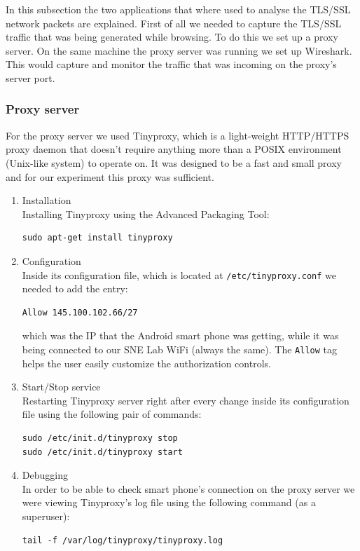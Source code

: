 \documentclass[12pt, a4paper]{report}
\begin{document}
In this subsection the two applications that where used to analyse the TLS/SSL network packets are explained. First of all we needed to capture the TLS/SSL traffic that was being generated while browsing. To do this we set up a proxy server. On the same machine the proxy server was running we set up Wireshark. This would capture and monitor the traffic that was incoming on the proxy's server port.


\subsubsection{Proxy server}

For the proxy server we used Tinyproxy, which is a light-weight HTTP/HTTPS proxy daemon that doesn't require anything more than a POSIX environment (Unix-like system) to operate on. It was designed to be a fast and small proxy and for our experiment this proxy was sufficient.

\begin{enumerate}
\item Installation \\
Installing Tinyproxy using the Advanced Packaging Tool:
\begin{lstlisting}[frame=single, breaklines=true]
sudo apt-get install tinyproxy			
\end{lstlisting}	

\item Configuration \\
Inside its configuration file, which is located at \texttt{/etc/tinyproxy.conf} we needed to add the entry:
\begin{lstlisting}[frame=single, breaklines=true]
Allow 145.100.102.66/27			
\end{lstlisting}		
which was the IP that the Android smart phone was getting, while it 			was being connected to our SNE Lab WiFi (always the same). The \texttt{Allow} tag helps the user easily customize the authorization controls. 

\item Start/Stop service \\
Restarting Tinyproxy server right after every change inside its configuration file using the following pair of commands:
\begin{lstlisting}[frame=single, breaklines=true]
sudo /etc/init.d/tinyproxy stop
sudo /etc/init.d/tinyproxy start			
\end{lstlisting}

\item Debugging \\
In order to be able to check smart phone's connection on the proxy server we were viewing Tinyproxy's log file using the following command (as a superuser):
\begin{lstlisting}[frame=single, breaklines=true]
tail -f /var/log/tinyproxy/tinyproxy.log
\end{lstlisting}
\end{enumerate}
\end{document}
